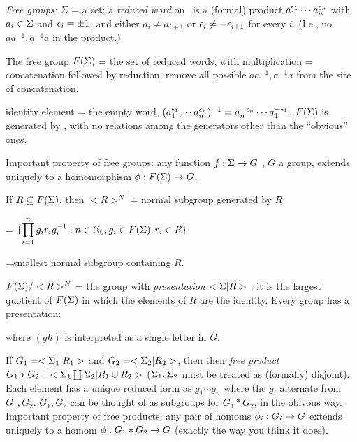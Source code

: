 \msk

{\it Free groups:} $\Sigma$ = a set; a {\it reduced word} on \msig\ is a (formal)
product $a_1^{\epsilon_1}\cdots a_n^{\epsilon_n}$ with $a_i\in\Sigma$ and $\epsilon_i=\pm 1$,
and either $a_i\neq a_{i+1}$ or $\epsilon_i\neq -\epsilon_{i+1}$ for every $i$. (I.e., no
$aa^{-1},a^{-1}a$ in the product.)

\ssk

The free group $F(\Sigma)$ = the set of reduced words, with multiplication = concatenation 
followed by reduction; remove all possible $aa^{-1},a^{-1}a$ from the site of concatenation.

\ssk

identity element = the empty word, 
$(a_1^{\epsilon_1}\cdots a_n^{\epsilon_n})^{-1} = a_n^{-\epsilon_n}\cdots a_1^{-\epsilon_1}$. 
$F(\Sigma)$ is generated by \msig, with no relations among the generators
other than the ``obvious'' ones.

\msk

Important property of free groups: any function $f:\Sigma\rightarrow G$ , $G$ a group, extends
uniquely to a homomorphism $\phi: F(\Sigma)\rightarrow G$.

\msk

If $R\subseteq F(\Sigma)$, then $<R>^N$ = normal subgroup generated by $R$ 

= $\displaystyle \{\prod_{i=1}^n g_i r_i g_i^{-1} : n\in{\Bbb N}_0 , g_i\in F(\Sigma) , r_i\in R\}$

=smallest normal subgroup containing $R$.

\ssk

$F(\Sigma)/<R>^N$ = the group with {\it presentation} $<\Sigma | R>$ ; it is the largest quotient
of $F(\Sigma)$ in which the elements of $R$ are the identity. Every group has a presentation:


where $(gh)$ is interpreted as a single letter in $G$.

\msk

If $G_1=<\Sigma_1 | R_1>$ and $G_2=<\Sigma_2 | R_2>$, then their {\it free product}
$G_1*G_2 = <\Sigma_1\coprod\Sigma_2 | R_1\cup R_2>$ ($\Sigma_1,\Sigma_2$ must be 
treated as (formally) disjoint). Each element has a unique reduced form as
$g_1\cdots g_n$ where the $g_i$ alternate from $G_1,G_2$.
$G_1,G_2$ can be thought of as subgroups for $G_1*G_2$, in the obivous way.
Important property of free products: any pair of
homoms $\phi_i:G_i\rightarrow G$ extends uniquely to a homom $\phi:G_1*G_2\rightarrow G$
(exactly the way you think it does).

